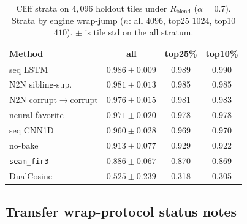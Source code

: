 \begin{table}[htbp]
  \centering
  \caption{Cliff strata on $4{,}096$ holdout tiles under $R_{\mathrm{blend}}$ ($\alpha{=}0.7$).
  Strata by engine wrap-jump ($n$: all $4096$, top25 $1024$, top10 $410$).
  $\pm$ is tile std on the all stratum.}
  \label{tab:cliff-strata}
  \setlength{\tabcolsep}{3pt}
  \footnotesize
  \begin{tabular}{@{}lccc@{}}
    \toprule
    Method & all & top25\% & top10\% \\
    \midrule
    seq LSTM & $0.986\pm0.009$ & 0.989 & 0.990 \\
    N2N sibling-sup. & $0.981\pm0.013$ & 0.985 & 0.985 \\
    N2N corrupt$\to$corrupt & $0.976\pm0.015$ & 0.981 & 0.983 \\
    neural favorite & $0.971\pm0.020$ & 0.978 & 0.978 \\
    seq CNN1D & $0.960\pm0.028$ & 0.969 & 0.970 \\
    no-bake & $0.913\pm0.077$ & 0.929 & 0.922 \\
    \texttt{seam\_fir3} & $0.886\pm0.067$ & 0.870 & 0.869 \\
    DualCosine & $0.525\pm0.239$ & 0.318 & 0.305 \\
    \bottomrule
  \end{tabular}
\end{table}






\subsection{Transfer wrap-protocol status notes}
\label{sec:app-transfer-status}


